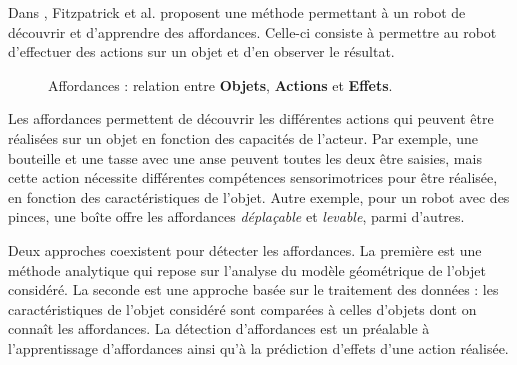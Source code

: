 \documentclass{llncs}
\begin{document}
Dans \cite{Fitzpatrick2003}, Fitzpatrick et al. proposent une méthode permettant à un robot de découvrir et d'apprendre des affordances.
Celle-ci consiste à permettre au robot d'effectuer des actions sur un objet et d'en observer le résultat.

\begin{figure}
  \centering
  \caption{Affordances : relation entre \textbf{Objets}, \textbf{Actions} et \textbf{Effets}.}
  \label{fig:affordances}
\end{figure}

 

Les affordances permettent de découvrir les différentes actions qui peuvent être réalisées sur un objet en fonction des capacités de l'acteur.
Par exemple, une bouteille et une tasse avec une anse peuvent toutes les deux être saisies, mais cette action nécessite différentes compétences sensorimotrices pour être réalisée, en fonction des caractéristiques de l'objet.
Autre exemple, pour un robot avec des pinces, une boîte offre les affordances \textit{déplaçable} et \textit{levable}, parmi d'autres.

Deux  approches coexistent pour détecter les affordances.
La première est une méthode analytique qui repose sur l'analyse du modèle géométrique de l'objet considéré.
La seconde est une approche basée sur le traitement des données : les caractéristiques de l'objet considéré sont comparées à celles d'objets dont on connaît les affordances.
La détection d'affordances est un préalable à l'apprentissage d'affordances \cite{Jamone2016} ainsi qu'à la prédiction d'effets d'une action réalisée.
\end{document}
